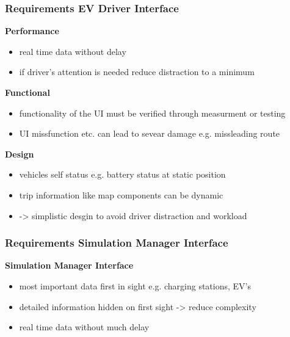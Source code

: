 \begin{frame}
	\frametitle{Requirements EV Driver Interface}
	\begin{PraesentationAufzaehlung}
		
		\item \textbf{Performance}
		\begin{itemize}
			\item real time data without delay	
			\item if driver's attention is needed reduce distraction to a minimum 		
		\end{itemize}	
		
		\vspace{-8mm}
		
		\item \textbf{Functional}
		\begin{itemize}
			\item functionality of the UI must be verified through measurment or testing
			\item UI missfunction etc. can lead to sevear damage e.g. missleading route 
		\end{itemize}
		\vspace{-8mm}
		\item \textbf{Design}
		\begin{itemize}
			\item vehicles self status e.g. battery status at static position
			\item trip information like map components can be dynamic 
			\item -> simplistic desgin to avoid driver distraction and workload
		\end{itemize}
		
	\end{PraesentationAufzaehlung}
	\vspace{-2mm}
	
	
\end{frame}
\clearpage

\begin{frame}
	\frametitle{Requirements Simulation Manager Interface}
	\begin{PraesentationAufzaehlung}
		
		\item \textbf{Simulation Manager Interface}
		\begin{itemize}
			\item	most important data first in sight e.g. charging stations, EV's
			\item 	detailed information hidden on first sight -> reduce complexity
			\item 	real time data without much delay
		\end{itemize}	
	
	\end{PraesentationAufzaehlung}
	\vspace{-2mm}
	
	
\end{frame}
\clearpage



